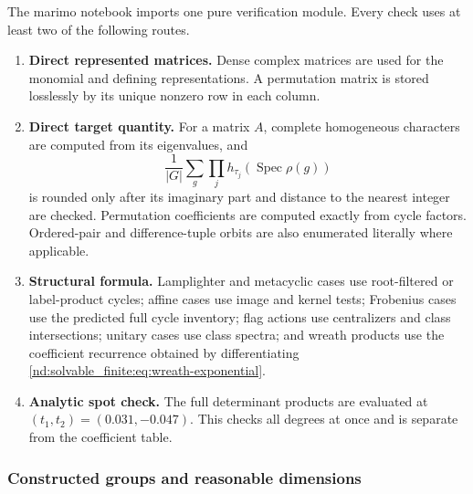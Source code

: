 \documentclass[10pt]{article}
\begin{document}
The marimo notebook imports one pure verification module.  Every check uses
at least two of the following routes.

\begin{enumerate}
\item \textbf{Direct represented matrices.}  Dense complex matrices are used
for the monomial and defining representations.  A permutation matrix is
stored losslessly by its unique nonzero row in each column.
\item \textbf{Direct target quantity.}  For a matrix $A$, complete homogeneous
characters are computed from its eigenvalues, and
\[
 \frac1{|G|}\sum_g\prod_j h_{\tau_j}(\operatorname{Spec}\rho(g))
\]
is rounded only after its imaginary part and distance to the nearest integer
are checked.  Permutation coefficients are computed exactly from cycle
factors.  Ordered-pair and difference-tuple orbits are also enumerated
literally where applicable.
\item \textbf{Structural formula.}  Lamplighter and metacyclic cases use
root-filtered or label-product cycles; affine cases use image and kernel
tests; Frobenius cases use the predicted full cycle inventory; flag actions
use centralizers and class intersections; unitary cases use class spectra;
and wreath products use the coefficient recurrence obtained by differentiating
\eqref{nd:solvable_finite:eq:wreath-exponential}.
\item \textbf{Analytic spot check.}  The full determinant products are
evaluated at $(t_1,t_2)=(0.031,-0.047)$.  This checks all degrees at once and
is separate from the coefficient table.
\end{enumerate}

\subsubsection{Constructed groups and reasonable dimensions}
\end{document}
